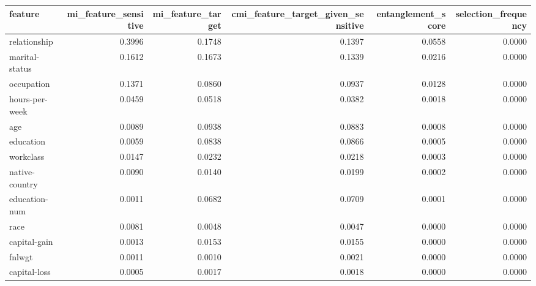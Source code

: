 \begin{tabular}{lrrrrr}
\toprule
feature & mi\_feature\_sensitive & mi\_feature\_target & cmi\_feature\_target\_given\_sensitive & entanglement\_score & selection\_frequency \\
\midrule
relationship & 0.3996 & 0.1748 & 0.1397 & 0.0558 & 0.0000 \\
marital-status & 0.1612 & 0.1673 & 0.1339 & 0.0216 & 0.0000 \\
occupation & 0.1371 & 0.0860 & 0.0937 & 0.0128 & 0.0000 \\
hours-per-week & 0.0459 & 0.0518 & 0.0382 & 0.0018 & 0.0000 \\
age & 0.0089 & 0.0938 & 0.0883 & 0.0008 & 0.0000 \\
education & 0.0059 & 0.0838 & 0.0866 & 0.0005 & 0.0000 \\
workclass & 0.0147 & 0.0232 & 0.0218 & 0.0003 & 0.0000 \\
native-country & 0.0090 & 0.0140 & 0.0199 & 0.0002 & 0.0000 \\
education-num & 0.0011 & 0.0682 & 0.0709 & 0.0001 & 0.0000 \\
race & 0.0081 & 0.0048 & 0.0047 & 0.0000 & 0.0000 \\
capital-gain & 0.0013 & 0.0153 & 0.0155 & 0.0000 & 0.0000 \\
fnlwgt & 0.0011 & 0.0010 & 0.0021 & 0.0000 & 0.0000 \\
capital-loss & 0.0005 & 0.0017 & 0.0018 & 0.0000 & 0.0000 \\
\bottomrule
\end{tabular}
